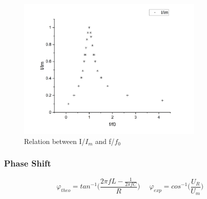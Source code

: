 \documentclass[12pt,a4paper]{article}
\begin{document}
\begin{figure}[H]
    \centering
    \includegraphics[width=9cm]{iimff0.png}
    \caption{Relation between I/$I_m$ and f/$f_0$}
\end{figure}

\subsubsection{Phase Shift}
$$\varphi_{theo}={tan}^{-1}{(}\frac{2\pi fL-\frac{1}{2\pi fC}}{R})~~~~~~\varphi_{exp}={cos}^{-1}{(}\frac{U_R}{U_m})$$
\end{document}
